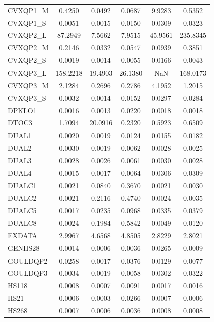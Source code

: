 \begin{longtable}{lccccc}
CVXQP1\_M &   0.4250 &   0.0492 &   0.0687 &   9.9283 &   0.5352 \\
CVXQP1\_S &   0.0051 &   0.0015 &   0.0150 &   0.0309 &   0.0323 \\
CVXQP2\_L &  87.2949 &   7.5662 &   7.9515 &  45.9561 & 235.8345 \\
CVXQP2\_M &   0.2146 &   0.0332 &   0.0547 &   0.0939 &   0.3851 \\
CVXQP2\_S &   0.0019 &   0.0014 &   0.0055 &   0.0166 &   0.0043 \\
CVXQP3\_L & 158.2218 &  19.4903 &  26.1380 &      NaN & 168.0173 \\
CVXQP3\_M &   2.1284 &   0.2696 &   0.2786 &   4.1952 &   1.2015 \\
CVXQP3\_S &   0.0032 &   0.0014 &   0.0152 &   0.0297 &   0.0284 \\
DPKLO1   &   0.0016 &   0.0013 &   0.0220 &   0.0018 &   0.0018 \\
DTOC3    &   1.7094 &  20.0916 &   0.2320 &   0.5923 &   0.6509 \\
DUAL1    &   0.0020 &   0.0019 &   0.0124 &   0.0155 &   0.0182 \\
DUAL2    &   0.0030 &   0.0019 &   0.0062 &   0.0028 &   0.0025 \\
DUAL3    &   0.0028 &   0.0026 &   0.0061 &   0.0030 &   0.0028 \\
DUAL4    &   0.0015 &   0.0017 &   0.0064 &   0.0306 &   0.0309 \\
DUALC1   &   0.0021 &   0.0840 &   0.3670 &   0.0021 &   0.0030 \\
DUALC2   &   0.0021 &   0.2116 &   0.4740 &   0.0024 &   0.0035 \\
DUALC5   &   0.0017 &   0.0235 &   0.0968 &   0.0335 &   0.0379 \\
DUALC8   &   0.0024 &   0.1984 &   0.5842 &   0.0049 &   0.0120 \\
EXDATA   &   2.9967 &   4.6568 &   4.8505 &   2.8229 &   2.8021 \\
GENHS28  &   0.0014 &   0.0006 &   0.0036 &   0.0265 &   0.0009 \\
GOULDQP2 &   0.0258 &   0.0017 &   0.0376 &   0.0129 &   0.0077 \\
GOULDQP3 &   0.0034 &   0.0019 &   0.0058 &   0.0302 &   0.0322 \\
HS118    &   0.0008 &   0.0007 &   0.0091 &   0.0017 &   0.0016 \\
HS21     &   0.0006 &   0.0003 &   0.0266 &   0.0007 &   0.0006 \\
HS268    &   0.0007 &   0.0006 &   0.0036 &   0.0008 &   0.0008 \\

\end{longtable}
